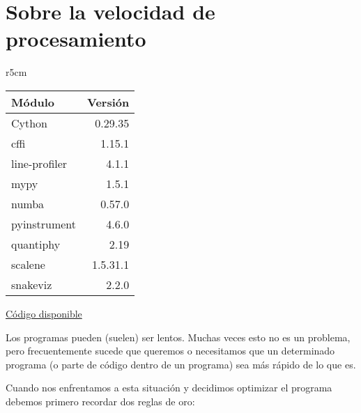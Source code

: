 

\chapter{Sobre la velocidad de procesamiento} \label{ch:profiling}

\begin{wraptable}{r}{5cm}
\begin{modulesinfo}
\begin{center}
{\small
    \begin{tabular}{l r}
        \toprule
        \textbf{Módulo} & \textbf{Versión} \\
        \midrule
        Cython & 0.29.35 \\
        cffi & 1.15.1 \\
        line-profiler & 4.1.1 \\
        mypy & 1.5.1 \\
        numba & 0.57.0 \\
        pyinstrument & 4.6.0 \\
        quantiphy & 2.19 \\
        scalene & 1.5.31.1 \\
        snakeviz & 2.2.0 \\
        \bottomrule
    \end{tabular}
    \vspace{0.75em}
    
    \href{https://github.com/facundobatista/libro-pyciencia/tree/master/código/profiling/}{Código disponible}
}
\end{center}
\end{modulesinfo}
\end{wraptable}

Los programas pueden (suelen) ser lentos. Muchas veces esto no es un problema, pero frecuentemente sucede que queremos o necesitamos que un determinado programa (o parte de código dentro de un programa) sea más rápido de lo que es.

Cuando nos enfrentamos a esta situación y decidimos optimizar el programa debemos primero recordar dos reglas de oro:

